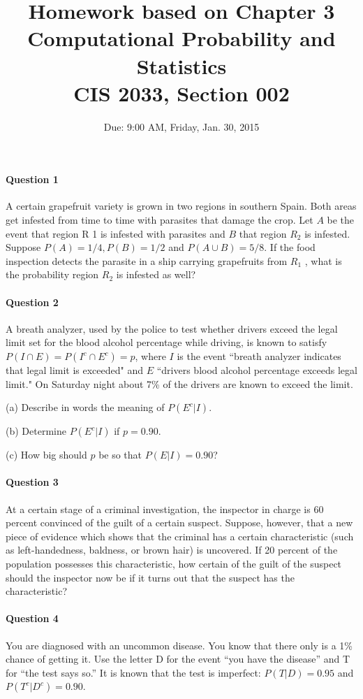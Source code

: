 \documentclass[11pt]{article} %
\title{Homework based on Chapter 3\\
Computational Probability and Statistics \\
CIS 2033, Section 002}
\author{Due: 9:00 AM, Friday, Jan. 30, 2015}
\date{} %
\begin{document}
\maketitle
\paragraph*{Question 1}
A certain grapefruit variety is grown in two regions in southern Spain. Both areas get infested from time to time with parasites that damage the crop. Let $A$ be the event that region R 1 is infested with parasites and $B$ that region $R_2$ is infested. Suppose $P (A) = 1/4, P (B) = 1/2$ and $P (A \cup B) = 5/8.$ If the food inspection detects the parasite in a ship carrying grapefruits from $R_1$ , what is the probability region $R_2$ is infested as well?
\paragraph*{Question 2}
A breath analyzer, used by the police to test whether drivers exceed the legal limit set for the blood alcohol percentage while driving, is known to satisfy $P(I \cap E) = P(I^c \cap E^c) = p$, where $I$ is the event ``breath analyzer indicates that legal limit is exceeded" and $E$ ``drivers blood alcohol percentage exceeds legal limit." On Saturday night about 7\% of the drivers are known to exceed the limit.

(a) Describe in words the meaning of $P(E^c | I)$. 

(b) Determine $P(E^c | I)$ if $p = 0.90$.

(c) How big should $p$ be so that $P(E | I) = 0.90$?

\paragraph*{Question 3}
At a certain stage of a criminal investigation, the inspector in charge is 60 percent convinced of the guilt of a certain suspect. Suppose, however, that a new piece of evidence which shows that the criminal has a certain characteristic (such as left-handedness, baldness, or brown hair) is uncovered. If 20 percent of the population possesses this characteristic, how certain of the guilt of the suspect should the inspector now be if it turns out that the suspect has the characteristic?

\paragraph*{Question 4}
You are diagnosed with an uncommon disease. You know that there only is a 1\% chance of getting it. Use the letter D for the event “you have the disease” and T for “the test says so.” It is known that the test is imperfect: $P (T | D) = 0.95$ and $P (T^c | D^c ) = 0.90$.
\end{document}
